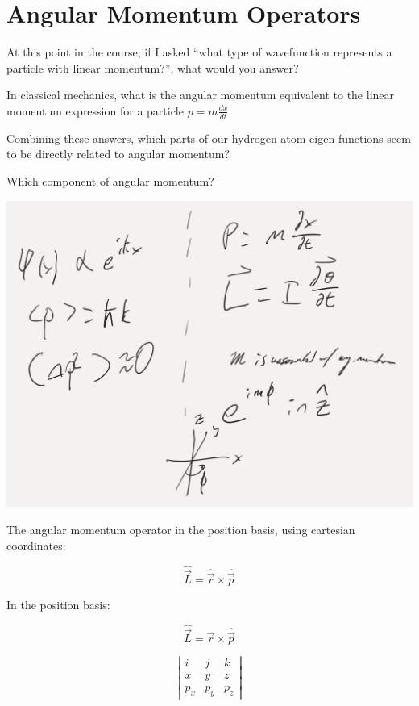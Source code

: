 \documentclass{article}
\begin{document}
\section{Angular Momentum Operators}

At this point in the course, if I asked “what type of wavefunction represents a particle with linear momentum?”, what would you answer?



In classical mechanics, what is the angular momentum equivalent to the linear momentum expression for a particle $p = m \frac{dx}{dt}$



Combining these answers, which parts of our hydrogen atom eigen functions seem to be directly related to angular momentum?



Which component of angular momentum?

\includegraphics[width = 0.95 \textwidth]{Lecture21/9.png}

The angular momentum operator in the position basis, using cartesian coordinates:

$$\hat{\vec{L}} = \hat{\vec{r}} \times \hat{\vec{p}}$$

In the position basis:

$$\hat{\vec{L}}  = \vec{r} \times \hat{\vec{p}}$$

$$\left| \begin{matrix} i & j & k \\ x & y & z \\ p_x & p_y & p_z \end{matrix} \right|$$
\end{document}
